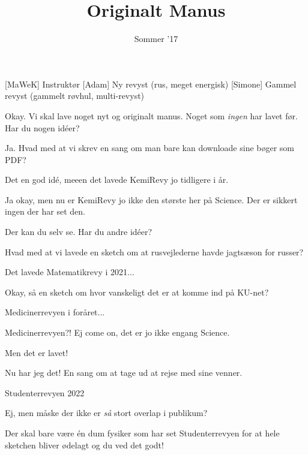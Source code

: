 \documentclass[a4paper,11pt]{article}
\title{Originalt Manus}
\author{Sommer '17}
\begin{document}
\maketitle

\begin{roles}
[MaWeK] Instruktør
[Adam] Ny revyst (rus, meget energisk)
[Simone] Gammel revyst (gammelt røvhul, multi-revyst)
\end{roles}

\begin{props}
\end{props}

\begin{sketch}

 Okay. Vi skal lave noget nyt og originalt manus. Noget som \emph{ingen} har lavet før. Har du nogen idéer?

 Ja. Hvad med at vi skrev en sang om man bare kan downloade sine bøger som PDF?

 Det en god idé, meeen det lavede KemiRevy jo tidligere i år.

 Ja okay, men nu er KemiRevy jo ikke den største her på Science. Der er sikkert ingen der har set den.


 Der kan du selv se. Har du andre idéer?

 Hvad med at vi lavede en sketch om at rusvejlederne havde jagtsæson for russer?

 Det lavede Matematikrevy i 2021...

 Okay, så en sketch om hvor vanskeligt det er at komme ind på KU-net?

 Medicinerrevyen i foråret...

 Medicinerrevyen?! Ej come on, det er jo ikke engang Science.

 Men det er lavet!

 Nu har jeg det! En sang om at tage ud at rejse med sine venner.

 Studenterrevyen 2022

 Ej, men måske der ikke er \emph{så} stort overlap i publikum?

 Der skal bare være én dum fysiker som har set Studenterrevyen for at hele sketchen bliver ødelagt og du ved det godt!


\end{sketch}
\end{document}

